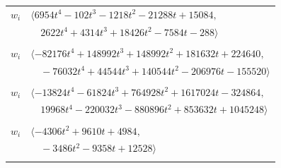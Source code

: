 \documentclass[11pt]{article}
\begin{document}
\begin{longtable}{@{}ll@{}}
$w_i$ & $\langle 6954t^{4}-102t^{3}-1218t^{2}-21288t+15084,$\\
 & $\quad 2622t^{4}+4314t^{3}+18426t^{2}-7584t-288\rangle$\\
\addlinespace[2pt]
\multicolumn{2}{@{}p{0.97\textwidth}@{}}{$i=8$, $D_i=8$, $e_i=2$, $\rho_{ij}$: $2{:}2, \allowbreak 11{:}3, \allowbreak 15{:}2, \allowbreak 32{:}3, \allowbreak 40{:}1, \allowbreak 41{:}1, \allowbreak 42{:}2, \allowbreak 48{:}2, \allowbreak 49{:}3, \allowbreak 50{:}3, \allowbreak 57{:}3, \allowbreak 59{:}2, \allowbreak 62{:}3, \allowbreak 70{:}2, \allowbreak 79{:}2, \allowbreak 80{:}2$}\\
$w_i$ & $\langle -82176t^{4}+148992t^{3}+148992t^{2}+181632t+224640,$\\
 & $\quad -76032t^{4}+44544t^{3}+140544t^{2}-206976t-155520\rangle$\\
\addlinespace[2pt]
\multicolumn{2}{@{}p{0.97\textwidth}@{}}{$i=9$, $D_i=16$, $e_i=3$, $\rho_{ij}$: $0{:}2, \allowbreak 3{:}3, \allowbreak 5{:}2, \allowbreak 10{:}1, \allowbreak 16{:}3, \allowbreak 18{:}2, \allowbreak 21{:}3, \allowbreak 32{:}1, \allowbreak 35{:}1, \allowbreak 37{:}3, \allowbreak 38{:}2, \allowbreak 41{:}2, \allowbreak 46{:}3, \allowbreak 48{:}2, \allowbreak 49{:}2, \allowbreak 52{:}2, \allowbreak 58{:}1, \allowbreak 64{:}2, \allowbreak 72{:}2$}\\
$w_i$ & $\langle -13824t^{4}-61824t^{3}+764928t^{2}+1617024t-324864,$\\
 & $\quad 19968t^{4}-220032t^{3}-880896t^{2}+853632t+1045248\rangle$\\
\addlinespace[2pt]
\multicolumn{2}{@{}p{0.97\textwidth}@{}}{$i=10$, $D_i=1$, $\rho_{ij}$: $6{:}3, \allowbreak 9{:}3, \allowbreak 14{:}2, \allowbreak 15{:}1, \allowbreak 20{:}2, \allowbreak 30{:}2, \allowbreak 36{:}1, \allowbreak 41{:}2, \allowbreak 45{:}2, \allowbreak 51{:}3, \allowbreak 61{:}1, \allowbreak 62{:}1, \allowbreak 69{:}3, \allowbreak 70{:}1, \allowbreak 72{:}2, \allowbreak 77{:}3, \allowbreak 78{:}2, \allowbreak 80{:}3$}\\
$w_i$ & $\langle -4306t^{2}+9610t+4984,$\\
 & $\quad -3486t^{2}-9358t+12528\rangle$\\
\addlinespace[2pt]
\multicolumn{2}{@{}p{0.97\textwidth}@{}}{$i=11$, $D_i=1$, $\rho_{ij}$: $6{:}2, \allowbreak 7{:}1, \allowbreak 8{:}1, \allowbreak 14{:}3, \allowbreak 15{:}1, \allowbreak 41{:}1, \allowbreak 45{:}1, \allowbreak 54{:}3, \allowbreak 60{:}3, \allowbreak 69{:}2, \allowbreak 70{:}1, \allowbreak 76{:}1$}\\

\end{longtable}
\end{document}
